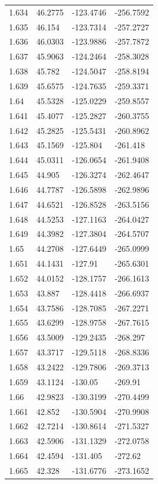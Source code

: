 \begin{tabular}{llll}
1.634 & 46.2775 & -123.4746 & -256.7592 \\
1.635 & 46.154 & -123.7314 & -257.2727 \\
1.636 & 46.0303 & -123.9886 & -257.7872 \\
1.637 & 45.9063 & -124.2464 & -258.3028 \\
1.638 & 45.782 & -124.5047 & -258.8194 \\
1.639 & 45.6575 & -124.7635 & -259.3371 \\
1.64 & 45.5328 & -125.0229 & -259.8557 \\
1.641 & 45.4077 & -125.2827 & -260.3755 \\
1.642 & 45.2825 & -125.5431 & -260.8962 \\
1.643 & 45.1569 & -125.804 & -261.418 \\
1.644 & 45.0311 & -126.0654 & -261.9408 \\
1.645 & 44.905 & -126.3274 & -262.4647 \\
1.646 & 44.7787 & -126.5898 & -262.9896 \\
1.647 & 44.6521 & -126.8528 & -263.5156 \\
1.648 & 44.5253 & -127.1163 & -264.0427 \\
1.649 & 44.3982 & -127.3804 & -264.5707 \\
1.65 & 44.2708 & -127.6449 & -265.0999 \\
1.651 & 44.1431 & -127.91 & -265.6301 \\
1.652 & 44.0152 & -128.1757 & -266.1613 \\
1.653 & 43.887 & -128.4418 & -266.6937 \\
1.654 & 43.7586 & -128.7085 & -267.2271 \\
1.655 & 43.6299 & -128.9758 & -267.7615 \\
1.656 & 43.5009 & -129.2435 & -268.297 \\
1.657 & 43.3717 & -129.5118 & -268.8336 \\
1.658 & 43.2422 & -129.7806 & -269.3713 \\
1.659 & 43.1124 & -130.05 & -269.91 \\
1.66 & 42.9823 & -130.3199 & -270.4499 \\
1.661 & 42.852 & -130.5904 & -270.9908 \\
1.662 & 42.7214 & -130.8614 & -271.5327 \\
1.663 & 42.5906 & -131.1329 & -272.0758 \\
1.664 & 42.4594 & -131.405 & -272.62 \\
1.665 & 42.328 & -131.6776 & -273.1652 \\

\end{tabular}
